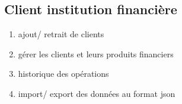 \documentclass{article}
\begin{document}
\subsection{Client institution financière}
\begin{enumerate}
	\item{ajout/ retrait de clients}
	\item{gérer les clients et leurs produits financiers}
	\item{historique des opérations}
	\item{import/ export des données au format json}
\end{enumerate}
\end{document}
